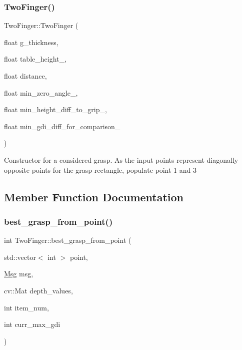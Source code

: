 \subsubsection{\texorpdfstring{Two\+Finger()}{TwoFinger()}\hspace{0.1cm}{\footnotesize\ttfamily [2/2]}}
{\footnotesize\ttfamily Two\+Finger\+::\+Two\+Finger (\begin{DoxyParamCaption}\item[{float}]{g\+\_\+thickness,  }\item[{float}]{table\+\_\+height\+\_\+,  }\item[{float}]{distance,  }\item[{float}]{min\+\_\+zero\+\_\+angle\+\_\+,  }\item[{float}]{min\+\_\+height\+\_\+diff\+\_\+to\+\_\+grip\+\_\+,  }\item[{float}]{min\+\_\+gdi\+\_\+diff\+\_\+for\+\_\+comparison\+\_\+ }\end{DoxyParamCaption})\hspace{0.3cm}{\ttfamily [inline]}}

Constructor for a considered grasp. As the input points represent diagonally opposite points for the grasp rectangle, populate point 1 and 3 

\subsection{Member Function Documentation}
\mbox{\label{classTwoFinger_a80d8942ee06dde64fdb4d8928903b4f2}} 
\subsubsection{\texorpdfstring{best\+\_\+grasp\+\_\+from\+\_\+point()}{best\_grasp\_from\_point()}}
{\footnotesize\ttfamily int Two\+Finger\+::best\+\_\+grasp\+\_\+from\+\_\+point (\begin{DoxyParamCaption}\item[{std\+::vector$<$ int $>$}]{point,  }\item[{\hyperlink{classMsg}{Msg}}]{msg,  }\item[{cv\+::\+Mat}]{depth\+\_\+values,  }\item[{int}]{item\+\_\+num,  }\item[{int}]{curr\+\_\+max\+\_\+gdi }\end{DoxyParamCaption})\hspace{0.3cm}{\ttfamily [inline]}}

